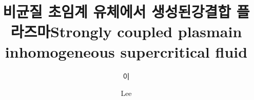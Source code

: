 \documentclass[doctor,english,final,pdfdoc]{style/postech-ucs}
\title[korean]{비균질 초임계 유체에서 생성된\linebreak 강결합 플라즈마}
\title[english]{Strongly coupled plasma\linebreak in inhomogeneous supercritical fluid}
\author[korean]{이}{승 택}
\author[english]{Lee}{Seungtaek}
\begin{document}
\begin{abstract}
    
\end{abstract}


\setcounter{tocdepth}{1} %
{
    \hypersetup{linkcolor=black}
    \tableofcontents %
}









\renewcommand{\thechapter}{\Alph{chapter}}
\renewcommand{\thesection}{\Alph{chapter}.\arabic{section}} %
\renewcommand{\thefigure}{\Alph{chapter}.\arabic{figure}} %
\renewcommand{\thetable}{\Alph{chapter}.\arabic{table}} %
\renewcommand{\theequation}{\Alph{chapter}.\arabic{equation}} %
\begin{appendices}
    
    
    
    
    
    
    
    
\end{appendices}


\begin{summarykorean}
    
\end{summarykorean}


{
\linespread{1.2}\selectfont %

}


\acknowledgement[korean]
\pagestyle{empty} %
{
\linespread{1.7}\selectfont %

}


\curriculumvitae[korean]



\afterpage{\blankpage}


\end{document}
